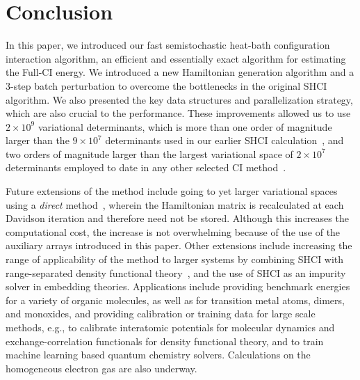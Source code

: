 \documentclass[%
reprint,
 superscriptaddress,
 amsmath,amssymb,
 aps,
]{revtex4-1}
\begin{document}
\section{Conclusion}
\label{conclusion}
In this paper, we introduced our fast semistochastic heat-bath configuration interaction algorithm, an efficient and essentially exact algorithm for estimating the Full-CI energy.
We introduced a new Hamiltonian generation algorithm and a 3-step batch perturbation to overcome the bottlenecks in the original SHCI algorithm.
We also presented the key data structures and parallelization strategy, which are also crucial to the performance.
These improvements allowed us to use $2 \times 10^9$ variational determinants, which is more than one order of magnitude larger than the $9\times 10^7$ determinants
used in our earlier SHCI calculation~\cite{ChiHolOttUmrShaZim-JPCA-18}, and two orders of magnitude larger than the largest variational space of $2\times 10^7$ determinants
employed to date in any other selected CI method~\cite{GarSceLooCaf-JCP-17}.

Future extensions of the method include going to yet larger variational spaces using a \emph{direct} method~\cite{Knowles1984,IvaRue-TCA-01}, wherein the Hamiltonian matrix is recalculated at each Davidson iteration and therefore need not be stored.
Although this increases the computational cost, the increase is not overwhelming because of the use of the auxiliary arrays introduced in this paper.
Other extensions include increasing the range of applicability of the method to larger systems by combining SHCI with range-separated density functional theory~\cite{Sav-INC-96},
and the use of SHCI as an impurity solver in embedding theories.
Applications include providing benchmark energies for a variety of organic molecules, as well as for transition metal atoms, dimers, and monoxides,
and providing calibration or training data for large scale methods,
e.g., to calibrate interatomic potentials for molecular dynamics and exchange-correlation functionals for density functional theory,
and to train machine learning based quantum chemistry solvers.
Calculations on the homogeneous electron gas are also underway.\\[1mm]
\end{document}
